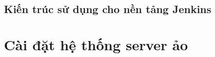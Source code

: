 %
%
%	
%	
%	
%	
%	
%	
%	
%	
%	
%
%	





\subsection{Kiến trúc sử dụng cho nền tảng Jenkins}

\section{Cài đặt hệ thống server ảo}